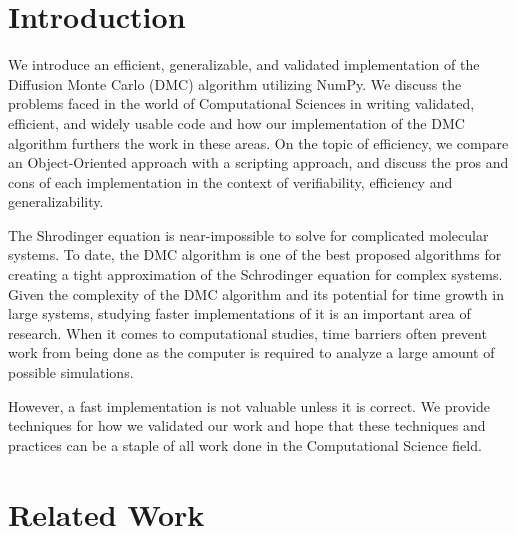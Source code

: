 \documentclass[journal=jacsat,manuscript=article]{achemso}
\begin{document}
\section{Introduction}
We introduce an efficient, generalizable, and validated implementation of the Diffusion Monte Carlo (DMC) algorithm utilizing NumPy. We discuss the problems faced in the world of Computational Sciences in writing validated, efficient, and widely usable code and how our implementation of the DMC algorithm furthers the work in these areas. On the topic of efficiency, we compare an Object-Oriented approach with a scripting approach, and discuss the pros and cons of each implementation in the context of verifiability, efficiency and generalizability. 

The Shrodinger equation is near-impossible to solve for complicated molecular systems. To date, the DMC algorithm is one of the best proposed algorithms for creating a tight approximation of the Schrodinger equation for complex systems. Given the complexity of the DMC algorithm and its potential for time growth in large systems, studying faster implementations of it is an important area of research. When it comes to computational studies, time barriers often prevent work from being done as the computer is required to analyze a large amount of possible simulations.

However, a fast implementation is not valuable unless it is correct. We provide techniques for how we validated our work and hope that these techniques and practices can be a staple of all work done in the Computational Science field. 
\section{Related Work}
\end{document}
